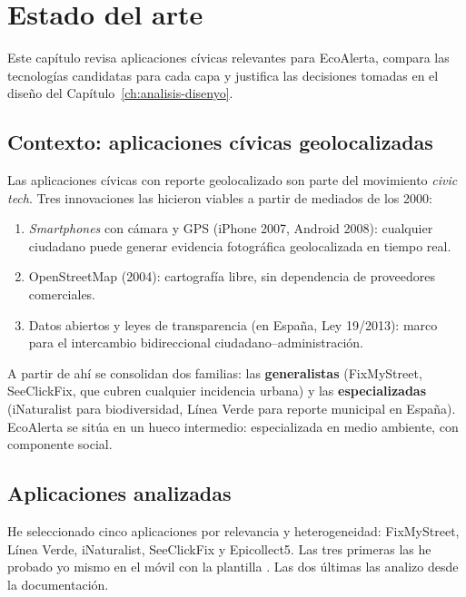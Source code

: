 \chapter{Estado del arte}
\label{ch:estado-del-arte}

Este capítulo revisa aplicaciones cívicas relevantes para EcoAlerta, compara las tecnologías candidatas para cada capa y justifica las decisiones tomadas en el diseño del Capítulo~\ref{ch:analisis-disenyo}.


\section{Contexto: aplicaciones cívicas geolocalizadas}
\label{sec:contexto-apps}

Las aplicaciones cívicas con reporte geolocalizado son parte del movimiento \textit{civic tech}. Tres innovaciones las hicieron viables a partir de mediados de los 2000:

\begin{enumerate}[leftmargin=1.2cm, itemsep=2pt]
  \item \textit{Smartphones} con cámara y GPS (iPhone 2007, Android 2008): cualquier ciudadano puede generar evidencia fotográfica geolocalizada en tiempo real.
  \item OpenStreetMap (2004): cartografía libre, sin dependencia de proveedores comerciales.
  \item Datos abiertos y leyes de transparencia (en España, Ley 19/2013): marco para el intercambio bidireccional ciudadano--administración.
\end{enumerate}

A partir de ahí se consolidan dos familias: las \textbf{generalistas} (FixMyStreet, SeeClickFix, que cubren cualquier incidencia urbana) y las \textbf{especializadas} (iNaturalist para biodiversidad, Línea Verde para reporte municipal en España). EcoAlerta se sitúa en un hueco intermedio: especializada en medio ambiente, con componente social.


\section{Aplicaciones analizadas}
\label{sec:apps-analizadas}

He seleccionado cinco aplicaciones por relevancia y heterogeneidad: FixMyStreet, Línea Verde, iNaturalist, SeeClickFix y Epicollect5. Las tres primeras las he probado yo mismo en el móvil con la plantilla . Las dos últimas las analizo desde la documentación.


